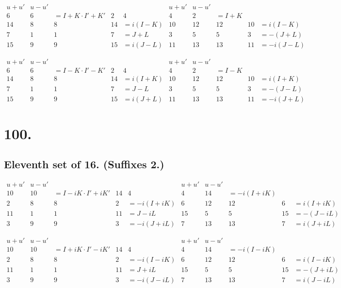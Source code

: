 \documentclass[11pt,a4paper]{article}
\begin{document}
\[
\begin{array}{c|cccc|c|cccc}
u+u' & u-u' & & & & u+u' & u-u' & & & \\
\hline
6 & 6 & = I+K \cdot I'+K' & 2 & 4 & 4 & 2 & = I+K \\
14 & 8 & 8 & 14 & = i(I-K) & 10 & 12 & 12 & 10 & = i(I-K) \\
7 & 1 & 1 & 7 & = J+L & 3 & 5 & 5 & 3 & = -(J+L) \\
15 & 9 & 9 & 15 & = i(J-L) & 11 & 13 & 13 & 11 & = -i(J-L)
\end{array}
\]

\[
\begin{array}{c|cccc|c|cccc}
u+u' & u-u' & & & & u+u' & u-u' & & & \\
\hline
6 & 6 & = I-K \cdot I'-K' & 2 & 4 & 4 & 2 & = I-K \\
14 & 8 & 8 & 14 & = i(I+K) & 10 & 12 & 12 & 10 & = i(I+K) \\
7 & 1 & 1 & 7 & = J-L & 3 & 5 & 5 & 3 & = -(J-L) \\
15 & 9 & 9 & 15 & = i(J+L) & 11 & 13 & 13 & 11 & = -i(J+L)
\end{array}
\]

\newpage
\section*{100.}
\label{sec:100}

\subsection*{Eleventh set of 16. (Suffixes 2.)}

\[
\begin{array}{c|cccc|c|cccc}
u+u' & u-u' & & & & u+u' & u-u' & & & \\
\hline
10 & 10 & = I-iK \cdot I'+iK' & 14 & 4 & 4 & 14 & = -i(I+iK) \\
2 & 8 & 8 & 2 & = -i(I+iK) & 6 & 12 & 12 & 6 & = i(I+iK) \\
11 & 1 & 1 & 11 & = J-iL & 15 & 5 & 5 & 15 & = -(J-iL) \\
3 & 9 & 9 & 3 & = -i(J+iL) & 7 & 13 & 13 & 7 & = i(J+iL)
\end{array}
\]

\[
\begin{array}{c|cccc|c|cccc}
u+u' & u-u' & & & & u+u' & u-u' & & & \\
\hline
10 & 10 & = I+iK \cdot I'-iK' & 14 & 4 & 4 & 14 & = -i(I-iK) \\
2 & 8 & 8 & 2 & = -i(I-iK) & 6 & 12 & 12 & 6 & = i(I-iK) \\
11 & 1 & 1 & 11 & = J+iL & 15 & 5 & 5 & 15 & = -(J+iL) \\
3 & 9 & 9 & 3 & = -i(J-iL) & 7 & 13 & 13 & 7 & = i(J-iL)
\end{array}
\]
\end{document}
